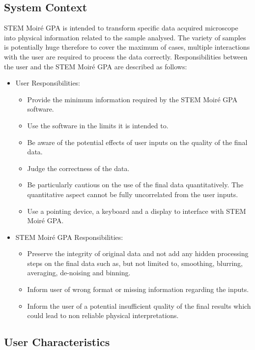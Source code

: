 \documentclass[12pt]{article}
\newcommand{\progname}{STEM Moir{\'e} GPA}
\begin{document}
\subsection{System Context}

\progname{} is intended to transform specific data acquired microscope into physical information related to the sample analysed. The variety of samples is potentially huge therefore to cover the maximum of cases, multiple interactions with the user are required to process the data correctly. Responsibilities between the user and the \progname{} are described as follows:

\begin{itemize}
\item User Responsibilities:
\begin{itemize}
\item Provide the minimum information required by the \progname{} software.
\item Use the software in the limits it is intended to.
\item Be aware of the potential effects of user inputs on the quality of the final data.
\item Judge the correctness of the data.
\item Be particularly cautious on the use of the final data quantitatively. The quantitative aspect cannot be fully uncorrelated from the user inputs. 
\item Use a pointing device, a keyboard and a display to interface with \progname{}.
\end{itemize}
\item \progname{} Responsibilities:
\begin{itemize}
\item Preserve the integrity of original data and not add any hidden processing steps on the final data such as, but not limited to, smoothing, blurring, averaging, de-noising and binning.
\item Inform user of wrong format or missing information regarding the inputs.
\item Inform the user of a potential insufficient quality of the final results which could lead to non reliable physical interpretations.
\end{itemize}
\end{itemize}

\subsection{User Characteristics} \label{SecUserCharacteristics}
\end{document}
